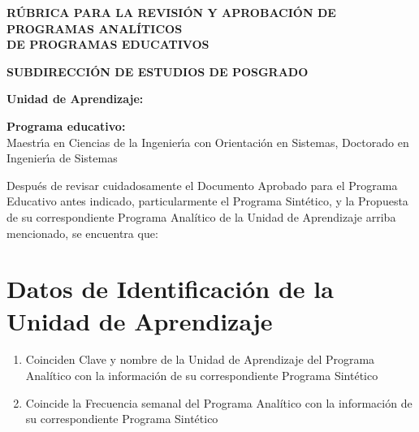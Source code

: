 \documentclass{article}
\begin{document}
\pagestyle{fancy}

\begin{center}
  {\bf R\'{U}BRICA PARA LA REVISI\'{O}N Y APROBACI\'{O}N DE PROGRAMAS ANAL\'{I}TICOS \\ DE PROGRAMAS EDUCATIVOS}

  {\bf SUBDIRECCI\'{O}N DE ESTUDIOS DE POSGRADO}
\end{center}

\begin{Form}

  {\bf Unidad de Aprendizaje:} \\
  \TextField[name=ua,multiline=false,bordercolor=black,align=0,width=\textwidth,height=7mm,default={Clave y nombre}]{}

{\bf Programa educativo:} \\
  \ChoiceMenu[print,combo,default=Seleccione,name=pr]{}%
           {Maestr\'{\i}a en Ciencias de la Ingenier\'{\i}a con Orientaci\'{o}n en Sistemas, %
             Doctorado en Ingenier\'{\i}a de Sistemas}

Despu\'{e}s de revisar cuidadosamente el Documento Aprobado para el
Programa Educativo antes indicado, particularmente el Programa
Sint\'{e}tico, y la Propuesta de su correspondiente Programa Anal\'{i}tico de
la Unidad de Aprendizaje arriba mencionado, se encuentra que:

\section{Datos de Identificaci\'{o}n de la Unidad de Aprendizaje}

\begin{enumerate}[leftmargin=*,nolistsep]

\item{Coinciden Clave y nombre de la Unidad de Aprendizaje del
  Programa Anal\'{i}tico con la informaci\'{o}n de su correspondiente
  Programa Sint\'{e}tico  \hfill {}
  \quad
  }

\item{Coincide la Frecuencia semanal del Programa Anal\'{i}tico con la
  informaci\'{o}n de su correspondiente Programa Sint\'{e}tico \begin{flushright}
  \quad
\end{flushright}
}


\end{enumerate}
\end{Form}
\end{document}
